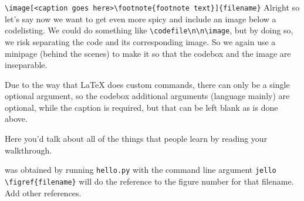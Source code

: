 \documentclass{writeup}
\begin{document}
\begin{walkthrough}
\verb|\image[<caption goes here>\footnote{footnote text}]{filename}|
\step
Alright so let's say now we want to get even more spicy and include an image below a codelisting. We could do something like \verb`\codefile\n\n\image`, but by doing so, we risk separating the code and its corresponding image. So we again use a minipage (behind the scenes) to make it so that the codebox and the image are inseparable.


Due to the way that LaTeX does custom commands, there can only be a single optional argument, so the codebox additional arguments (language mainly) are optional, while the caption is required, but that can be left blank as is done above.
\end{walkthrough}
\begin{conclusion}
Here you'd talk about all of the things that people learn by reading your walkthrough.
\end{conclusion}


\begin{references}
 {} was obtained by running \verb|hello.py| with the command line argument \verb|jello|
 \verb|\figref{filename}| will do the reference to the figure number for that filename.
 Add other references.
\end{references}
\end{document}

